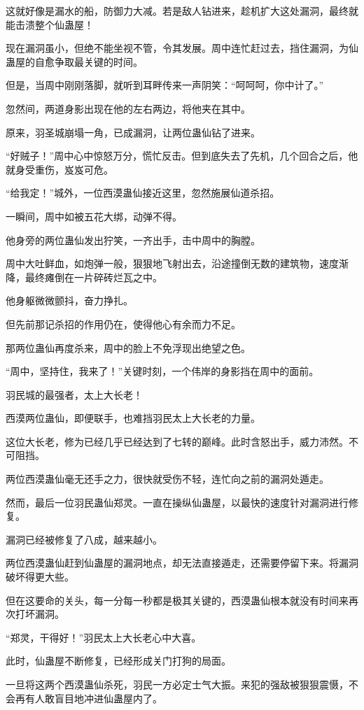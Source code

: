 \begin{this_body}
这就好像是漏水的船，防御力大减。若是敌人钻进来，趁机扩大这处漏洞，最终就能击溃整个仙蛊屋！

现在漏洞虽小，但绝不能坐视不管，令其发展。周中连忙赶过去，挡住漏洞，为仙蛊屋的自愈争取最关键的时间。

但是，当周中刚刚落脚，就听到耳畔传来一声阴笑：“呵呵呵，你中计了。”

忽然间，两道身影出现在他的左右两边，将他夹在其中。

原来，羽圣城崩塌一角，已成漏洞，让两位蛊仙钻了进来。

“好贼子！”周中心中惊怒万分，慌忙反击。但到底失去了先机，几个回合之后，他就身受重伤，岌岌可危。

“给我定！”城外，一位西漠蛊仙接近这里，忽然施展仙道杀招。

一瞬间，周中如被五花大绑，动弹不得。

他身旁的两位蛊仙发出狞笑，一齐出手，击中周中的胸膛。

周中大吐鲜血，如炮弹一般，狠狠地飞射出去，沿途撞倒无数的建筑物，速度渐降，最终瘫倒在一片碎砖烂瓦之中。

他身躯微微颤抖，奋力挣扎。

但先前那记杀招的作用仍在，使得他心有余而力不足。

那两位蛊仙再度杀来，周中的脸上不免浮现出绝望之色。

“周中，坚持住，我来了！”关键时刻，一个伟岸的身影挡在周中的面前。

羽民城的最强者，太上大长老！

西漠两位蛊仙，即便联手，也难挡羽民太上大长老的力量。

这位大长老，修为已经几乎已经达到了七转的巅峰。此时含怒出手，威力沛然。不可阻挡。

两位西漠蛊仙毫无还手之力，很快就受伤不轻，连忙向之前的漏洞处遁走。

然而，最后一位羽民蛊仙郑灵。一直在操纵仙蛊屋，以最快的速度针对漏洞进行修复。

漏洞已经被修复了八成，越来越小。

两位西漠蛊仙赶到仙蛊屋的漏洞地点，却无法直接遁走，还需要停留下来。将漏洞破坏得更大些。

但在这要命的关头，每一分每一秒都是极其关键的，西漠蛊仙根本就没有时间来再次打坏漏洞。

“郑灵，干得好！”羽民太上大长老心中大喜。

此时，仙蛊屋不断修复，已经形成关门打狗的局面。

一旦将这两个西漠蛊仙杀死，羽民一方必定士气大振。来犯的强敌被狠狠震慑，不会再有人敢盲目地冲进仙蛊屋内了。


\end{this_body}
